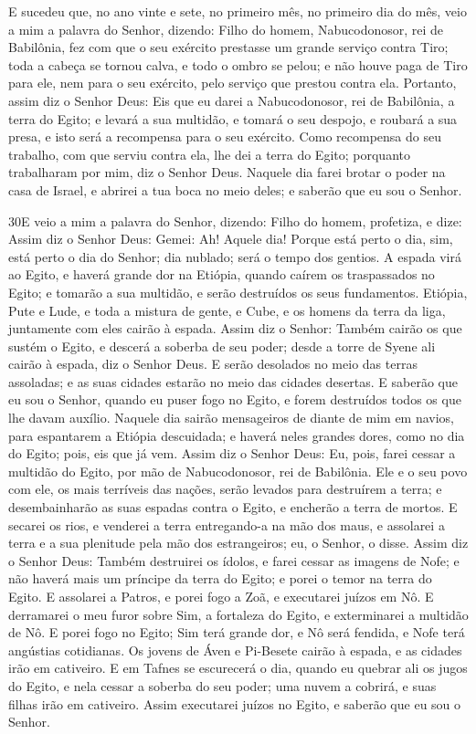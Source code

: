 E sucedeu que, no ano vinte e sete, no primeiro mês, no primeiro
dia do mês, veio a mim a palavra do Senhor, dizendo: Filho do
homem, Nabucodonosor, rei de Babilônia, fez com que o seu exército
prestasse um grande serviço contra Tiro; toda a cabeça se tornou
calva, e todo o ombro se pelou; e não houve paga de Tiro para ele,
nem para o seu exército, pelo serviço que prestou contra ela.
Portanto, assim diz o Senhor Deus: Eis que eu darei a
Nabucodonosor, rei de Babilônia, a terra do Egito; e levará a sua
multidão, e tomará o seu despojo, e roubará a sua presa, e isto será
a recompensa para o seu exército. Como recompensa do seu
trabalho, com que serviu contra ela, lhe dei a terra do Egito;
porquanto trabalharam por mim, diz o Senhor Deus. Naquele dia
farei brotar o poder na casa de Israel, e abrirei a tua boca no meio
deles; e saberão que eu sou o Senhor.

\medskip

\lettrine{30} E veio a mim a palavra do Senhor, dizendo:
Filho do homem, profetiza, e dize: Assim diz o Senhor Deus:
Gemei: Ah! Aquele dia! Porque está perto o dia, sim, está perto
o dia do Senhor; dia nublado; será o tempo dos gentios. A espada
virá ao Egito, e haverá grande dor na Etiópia, quando caírem os
traspassados no Egito; e tomarão a sua multidão, e serão destruídos
os seus fundamentos. Etiópia, Pute e Lude, e toda a mistura de
gente, e Cube, e os homens da terra da liga, juntamente com eles
cairão à espada. Assim diz o Senhor: Também cairão os que sustém
o Egito, e descerá a soberba de seu poder; desde a torre de Syene
ali cairão à espada, diz o Senhor Deus. E serão desolados no
meio das terras assoladas; e as suas cidades estarão no meio das
cidades desertas. E saberão que eu sou o Senhor, quando eu puser
fogo no Egito, e forem destruídos todos os que lhe davam auxílio.
Naquele dia sairão mensageiros de diante de mim em navios, para
espantarem a Etiópia descuidada; e haverá neles grandes dores, como
no dia do Egito; pois, eis que já vem. Assim diz o Senhor
Deus: Eu, pois, farei cessar a multidão do Egito, por mão de
Nabucodonosor, rei de Babilônia. Ele e o seu povo com ele, os
mais terríveis das nações, serão levados para destruírem a terra; e
desembainharão as suas espadas contra o Egito, e encherão a terra de
mortos. E secarei os rios, e venderei a terra entregando-a na
mão dos maus, e assolarei a terra e a sua plenitude pela mão dos
estrangeiros; eu, o Senhor, o disse. Assim diz o Senhor Deus:
Também destruirei os ídolos, e farei cessar as imagens de Nofe; e
não haverá mais um príncipe da terra do Egito; e porei o temor na
terra do Egito. E assolarei a Patros, e porei fogo a Zoã, e
executarei juízos em Nô. E derramarei o meu furor sobre Sim,
a fortaleza do Egito, e exterminarei a multidão de Nô. E
porei fogo no Egito; Sim terá grande dor, e Nô será fendida, e Nofe
terá angústias cotidianas. Os jovens de Áven e Pi-Besete
cairão à espada, e as cidades irão em cativeiro. E em Tafnes
se escurecerá o dia, quando eu quebrar ali os jugos do Egito, e nela
cessar a soberba do seu poder; uma nuvem a cobrirá, e suas filhas
irão em cativeiro. Assim executarei juízos no Egito, e
saberão que eu sou o Senhor.

